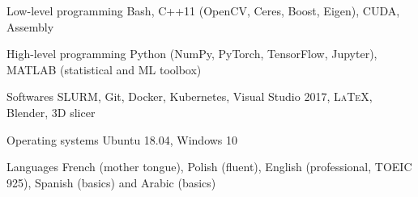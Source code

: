 


\begin{cvskills}


\cvskill
{Low-level programming} %
{Bash, C++11 (OpenCV, Ceres, Boost, Eigen), CUDA, Assembly} %


\cvskill
{High-level programming} %
{Python (NumPy, PyTorch, TensorFlow, Jupyter), MATLAB (statistical and ML toolbox)} %


\cvskill
{Softwares} %
{SLURM, Git, Docker, Kubernetes, Visual Studio 2017, \textsc{\LaTeX}, Blender, 3D slicer} %


\cvskill
{Operating systems} %
{Ubuntu 18.04, Windows 10} %


\cvskill
{Languages} %
{French (mother tongue), Polish (fluent), English (professional, TOEIC 925), Spanish (basics) and Arabic (basics)} %


\end{cvskills}
